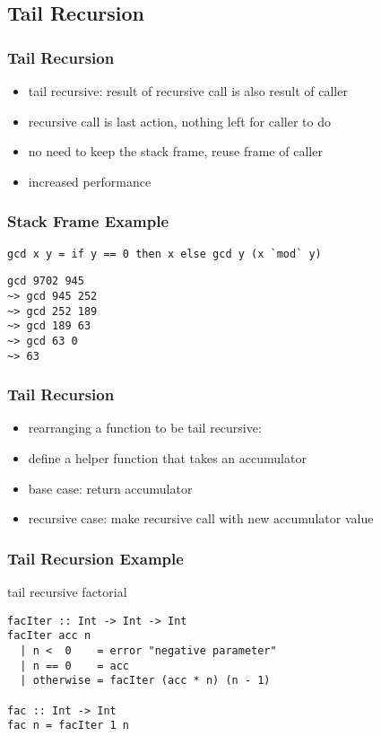 \documentclass[dvipsnames]{beamer}
\theoremstyle{plain}
\begin{document}
\subsection{Tail Recursion}

\begin{frame}
  \frametitle{Tail Recursion}

  \begin{itemize}
    \item \alert{tail recursive}: result of recursive call is also result of caller
    \item recursive call is last action, nothing left for caller to do

    \pause
    \bigskip
    \item no need to keep the stack frame, reuse frame of caller
    \item increased performance
  \end{itemize}
\end{frame}

\begin{frame}[fragile]
  \frametitle{Stack Frame Example}

  \begin{exampleblock}{}
    \begin{lstlisting}
gcd x y = if y == 0 then x else gcd y (x `mod` y)
    \end{lstlisting}

    \begin{lstlisting}[frame=single]
gcd 9702 945
~> gcd 945 252
~> gcd 252 189
~> gcd 189 63
~> gcd 63 0
~> 63
    \end{lstlisting}
  \end{exampleblock}
\end{frame}

\begin{frame}
  \frametitle{Tail Recursion}

  \begin{itemize}
    \item rearranging a function to be tail recursive:

    \medskip
    \item define a helper function that takes an accumulator
    \item base case: return accumulator
    \item recursive case: make recursive call with new accumulator value
  \end{itemize}
\end{frame}

\begin{frame}[fragile]
  \frametitle{Tail Recursion Example}

  \begin{exampleblock}{tail recursive factorial}
    \begin{lstlisting}
facIter :: Int -> Int -> Int
facIter acc n
  | n <  0    = error "negative parameter"
  | n == 0    = acc
  | otherwise = facIter (acc * n) (n - 1)

fac :: Int -> Int
fac n = facIter 1 n
    \end{lstlisting}
  \end{exampleblock}
\end{frame}
\end{document}
